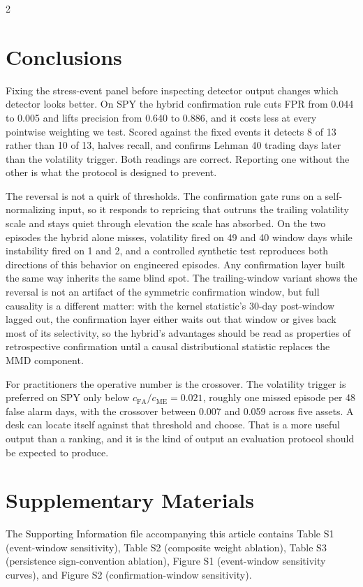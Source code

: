 \documentclass{book}
\begin{document}
\begin{multicols}{2}
\section{Conclusions}
Fixing the stress-event panel before inspecting detector output changes which detector looks better. On SPY the hybrid confirmation rule cuts FPR from 0.044 to 0.005 and lifts precision from 0.640 to 0.886, and it costs less at every pointwise weighting we test. Scored against the fixed events it detects 8 of 13 rather than 10 of 13, halves recall, and confirms Lehman 40 trading days later than the volatility trigger. Both readings are correct. Reporting one without the other is what the protocol is designed to prevent.

The reversal is not a quirk of thresholds. The confirmation gate runs on a self-normalizing input, so it responds to repricing that outruns the trailing volatility scale and stays quiet through elevation the scale has absorbed. On the two episodes the hybrid alone misses, volatility fired on 49 and 40 window days while instability fired on 1 and 2, and a controlled synthetic test reproduces both directions of this behavior on engineered episodes. Any confirmation layer built the same way inherits the same blind spot. The trailing-window variant shows the reversal is not an artifact of the symmetric confirmation window, but full causality is a different matter: with the kernel statistic's 30-day post-window lagged out, the confirmation layer either waits out that window or gives back most of its selectivity, so the hybrid's advantages should be read as properties of retrospective confirmation until a causal distributional statistic replaces the MMD component.

For practitioners the operative number is the crossover. The volatility trigger is preferred on SPY only below $c_{\mathrm{FA}}/c_{\mathrm{ME}}=0.021$, roughly one missed episode per 48 false alarm days, with the crossover between 0.007 and 0.059 across five assets. A desk can locate itself against that threshold and choose. That is a more useful output than a ranking, and it is the kind of output an evaluation protocol should be expected to produce.

\section*{Supplementary Materials}
The Supporting Information file accompanying this article contains Table S1 (event-window sensitivity), Table S2 (composite weight ablation), Table S3 (persistence sign-convention ablation), Figure S1 (event-window sensitivity curves), and Figure S2 (confirmation-window sensitivity).


\end{multicols}
\end{document}
